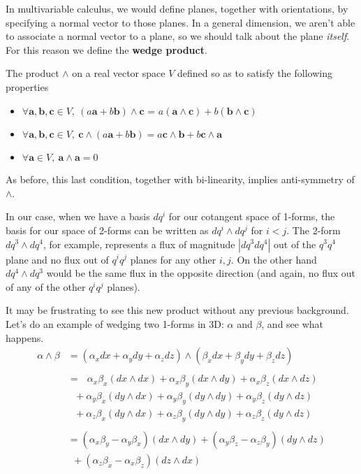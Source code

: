 \documentclass[../master.tex]{subfiles}
\begin{document}
	
	In multivariable calculus, we would define planes, together with orientations, by specifying a normal vector to those planes. In a general dimension, we aren't able to associate a normal vector to a plane, so we should talk about the plane \emph{itself}. For this reason we define the \textbf{wedge product}. 
	
	\begin{defn}\label{def:wedge}
		The product $\wedge$ on a real vector space $V$ defined so as to satisfy the following properties
		\begin{itemize}
			\item $ \forall \mathbf a,\mathbf b, \mathbf c \in V, ~ (a \mathbf a + b \mathbf b) \wedge \mathbf c$ = $ a (\mathbf a \wedge \mathbf c) + b (\mathbf b \wedge \mathbf c)$
			\item $ \forall \mathbf a,\mathbf b, \mathbf c \in V, ~ \mathbf c \wedge (a \mathbf a + b \mathbf b) = a \mathbf c \wedge \mathbf b + b \mathbf c \wedge \mathbf a$
			\item $\forall \mathbf a\in V, ~ \mathbf a \wedge \mathbf a = 0$
		\end{itemize}
	\end{defn}
	As before, this last condition, together with bi-linearity, implies anti-symmetry of $\wedge$.
	
	In our case, when we have a basis $dq^i$ for our cotangent space of 1-forms, the basis for our space of 2-forms can be written as $dq^i \wedge dq^j$ for $i<j$. The 2-form $dq^3 \wedge dq^4$, for example, represents a flux of magnitude $|dq^3 dq^4|$ out of the $q^3q^4$ plane and no flux out of $q^iq^j$ planes for any other $i,j$. On the other hand $dq^4 \wedge dq^3$ would be the same flux in the opposite direction (and again, no flux out of any of the other $q^i q^j$ planes).
	
	It may be frustrating to see this new product without any previous background. Let's do an example of wedging two 1-forms in 3D: $\alpha$ and $\beta$, and see what happens.
	\begin{align*}
		\alpha \wedge \beta &=(\alpha_x dx + \alpha_y dy + \alpha_z dz) \wedge (\beta_x dx + \beta_y dy + \beta_z dz) \\
		\\
		& =  ~~~ \alpha_x \beta_x (dx \wedge dx) + \alpha_x \beta_y (dx \wedge dy) + \alpha _x \beta_z (dx \wedge dz) \\
		 & ~~~ + \alpha_y \beta_x (dy \wedge dx) + \alpha_y \beta_y (dy \wedge dy) + \alpha_y \beta_z (dy \wedge dz) \\
		 & ~~~ + \alpha_z \beta_x (dy \wedge dx) + \alpha_z \beta_y (dy \wedge dy) + \alpha_z \beta_z (dy \wedge dz)\\
		 \\
		&=(\alpha_x \beta_y - \alpha_y \beta_x)(dx \wedge dy)+ (\alpha_y \beta_z - \alpha_z \beta_y)(dy \wedge dz)\\
		&  ~~ +(\alpha_z \beta_x - \alpha_x \beta_z)(dz \wedge dx) 
	\end{align*}
	
\end{document}
